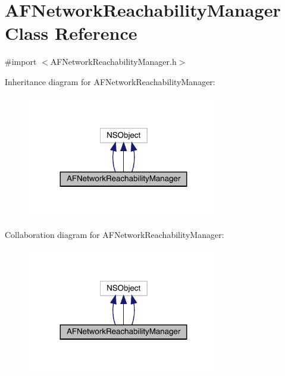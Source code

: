 \hypertarget{interface_a_f_network_reachability_manager}{}\section{A\+F\+Network\+Reachability\+Manager Class Reference}
\label{interface_a_f_network_reachability_manager}


{\ttfamily \#import $<$A\+F\+Network\+Reachability\+Manager.\+h$>$}



Inheritance diagram for A\+F\+Network\+Reachability\+Manager\+:\nopagebreak
\begin{figure}[H]
\begin{center}
\leavevmode
\includegraphics[width=239pt]{interface_a_f_network_reachability_manager__inherit__graph}
\end{center}
\end{figure}


Collaboration diagram for A\+F\+Network\+Reachability\+Manager\+:\nopagebreak
\begin{figure}[H]
\begin{center}
\leavevmode
\includegraphics[width=239pt]{interface_a_f_network_reachability_manager__coll__graph}
\end{center}
\end{figure}
